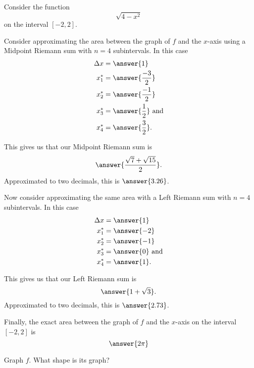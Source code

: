\documentclass{ximera}
\author{Nela Lakos \and Kyle Parsons}
\begin{document}
\begin{exercise}

Consider the function
\[
\sqrt{4-x^2}
\]
on the interval $[-2,2]$.

Consider approximating the area between the graph of $f$ and the $x$-axis using a Midpoint Riemann sum with $n=4$ subintervals.  In this case
\begin{align*}
\Delta x &= \answer{1}\\
x_1^* &= \answer{\frac{-3}{2}}\\
x_2^* &= \answer{\frac{-1}{2}}\\
x_3^* &= \answer{\frac{1}{2}}\text{ and}\\
x_4^* &= \answer{\frac{3}{2}}.
\end{align*}

This gives us that our Midpoint Riemann sum is 
\[
\answer{\frac{\sqrt{7}+\sqrt{15}}{2}}.
\]
Approximated to two decimals, this is $\answer{3.26}$.

Now consider approximating the same area with a Left Riemann sum with $n=4$ subintervals.  In this case
\begin{align*}
\Delta x &= \answer{1}\\
x_1^* &= \answer{-2}\\
x_2^* &= \answer{-1}\\
x_3^* &= \answer{0}\text{ and}\\
x_4^* &= \answer{1}.
\end{align*}

This gives us that our Left Riemann sum is
\[
\answer{1+\sqrt{3}}.
\]
Approximated to two decimals, this is $\answer{2.73}$.

Finally, the exact area between the graph of $f$ and the $x$-axis on the interval $[-2,2]$ is
\[
\answer{2\pi}
\]

\begin{hint}
Graph $f$. What shape is its graph?
\end{hint}

\end{exercise}
\end{document}
